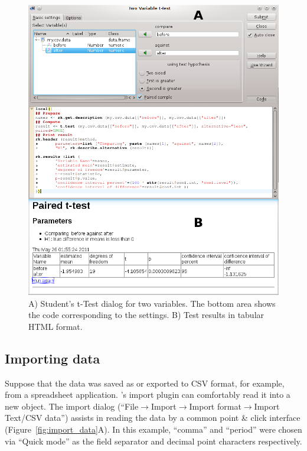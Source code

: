 \newpage
\begin{figure}[ht!]
 \centering
 \includegraphics[width=14cm]{./figures/t-test2.png}
 \caption{A) Student's t-Test dialog for two variables. The bottom area shows the  code corresponding to the settings.
  B) Test results in tabular HTML format. }
 \label{fig:t_test}
\end{figure}

\subsection{Importing data}
\label{sec:importing_data}
Suppose that the data was saved as or exported to CSV format, for example, from a 
spreadsheet application. 's import plugin can
comfortably read it into a new  object.
The import dialog (``File$\rightarrow$Import$\rightarrow$Import
format$\rightarrow$Import Text/CSV data'') assists in reading the
data by a common point \& click interface (Figure~\ref{fig:import_data}A). In this
example, ``comma'' and ``period'' were chosen via ``Quick mode'' as the field
separator and decimal point characters respectively.

